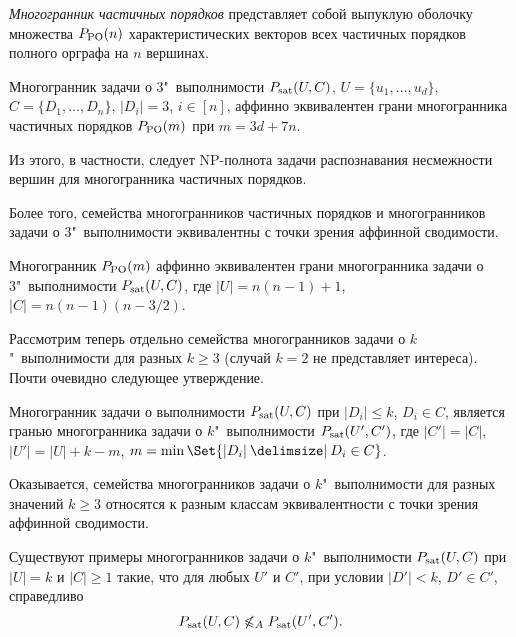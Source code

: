 \emph{Многогранник частичных порядков} представляет собой выпуклую оболочку множества $P_{\textup{PO}}(n)$ характеристических векторов всех частичных порядков полного орграфа на $n$ вершинах.

\begin{theorem}
Многогранник задачи о 3"~выполнимости $P_{\textup{sat}}(U,C)$, $U=\{u_1,\dots,u_d\}$, $C = \{D_1,\dots,D_n\}$, $|D_i|=3$, $i \in [n]$,  аффинно эквивалентен грани многогранника частичных порядков $P_{\textup{PO}}(m)$ при $m = 3d+7n$.
\end{theorem}

Из этого, в частности, следует NP-полнота задачи распознавания несмежности вершин для многогранника частичных порядков.

Более того, семейства многогранников частичных порядков и многогранников задачи о 3"~выполнимости эквивалентны с точки зрения аффинной сводимости.

\begin{theorem}
Многогранник $P_{\textup{PO}}(m)$ аффинно эквивалентен грани многогранника задачи о 3"~выполнимости $P_{\textup{sat}}(U,C)$, где $|U| = n(n-1)+1$, $|C| = n(n-1)(n-3/2)$.
\end{theorem}

Рассмотрим теперь отдельно семейства многогранников задачи о $k$"~выполнимости для разных $k \ge 3$ (случай $k=2$ не представляет интереса).
Почти очевидно следующее утверждение.

\begin{lemma}[Фиорини {\cite[Lemma 4.1]{Fiorini:2003}}]
Многогранник задачи о выполнимости $P_{\textup{sat}}(U,C)$ при $|D_i| \le k$, $D_i\in C$, является гранью многогранника задачи о $k$"~выполнимости $P_{\textup{sat}}(U',C')$, где $|C'|=|C|$, $|U'|=|U| + k - m$, $m = \min\Set{|D_i| \given D_i \in C}$.
\end{lemma}

Оказывается, семейства многогранников задачи о $k$"~выполнимости для разных значений $k \ge 3$ относятся к разным классам эквивалентности с точки зрения аффинной сводимости.

\begin{theorem}
\label{thm:kSAT}
\sloppy
Существуют примеры многогранников задачи о $k$"~выполнимости $P_{\textup{sat}}(U,C)$ при $|U|=k$ и $|C|\ge 1$ такие, что для любых $U'$ и $C'$, при условии $|D'| < k$, $D' \in C'$, справедливо
\[
P_{\textup{sat}}(U,C) \not\leqslant_A P_{\textup{sat}}(U',C').
\]
\end{theorem}

